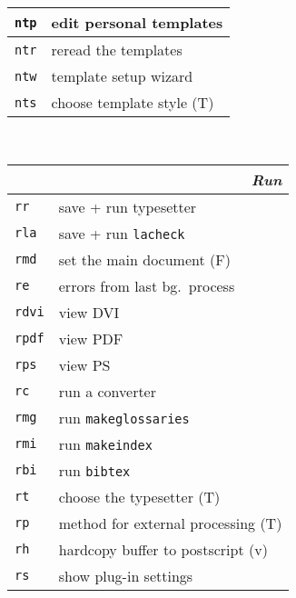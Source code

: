 \documentclass[oneside,10pt,landscape,DIV16]{scrartcl}
\newcommand{\Map}[1] {\textbf{\textasciiacute}\texttt{#1}}
\begin{document}
\begin{multicols}{3}
\begin{center}
\begin{tabular}[]{|p{11mm}|p{60mm}|}
\hline \Map{ntp} & edit personal templates   \\
\hline \Map{ntr} & reread the templates      \\
\hline \Map{ntw} & template setup wizard     \\
\hline \Map{nts} & choose template style     \hfill (T)\\
\hline
%
\end{tabular}\\
%
\begin{tabular}[]{|p{11mm}|p{62mm}|}
\hline
\multicolumn{2}{|r|}{\textsl{\textbf{R}un}} \\[1.0ex]
\hline \Map{rr}   & save + run typesetter                    \\
\hline \Map{rla}  & save + run \texttt{lacheck}              \\
\hline \Map{rmd}  & set the main document                    \hfill (F)\\
\hline \Map{re}   & errors from last bg.\ process            \\
\hline \Map{rdvi} & view DVI                                 \\
\hline \Map{rpdf} & view PDF                                 \\
\hline \Map{rps}  & view PS                                  \\
\hline \Map{rc}   & run a converter                          \\
\hline
\hline \Map{rmg}  & run \texttt{makeglossaries}              \\
\hline \Map{rmi}  & run \texttt{makeindex}                   \\
\hline \Map{rbi}  & run \texttt{bibtex}                      \\
\hline
\hline \Map{rt}   & choose the typesetter                    \hfill (T)\\
\hline \Map{rp}   & method for external processing           \hfill (T)\\
\hline
\hline \Map{rh}   & hardcopy buffer to postscript            \hfill (v)\\
\hline \Map{rs}   & show plug-in settings                    \\

\end{tabular}
\end{center}
\end{multicols}
\end{document}

